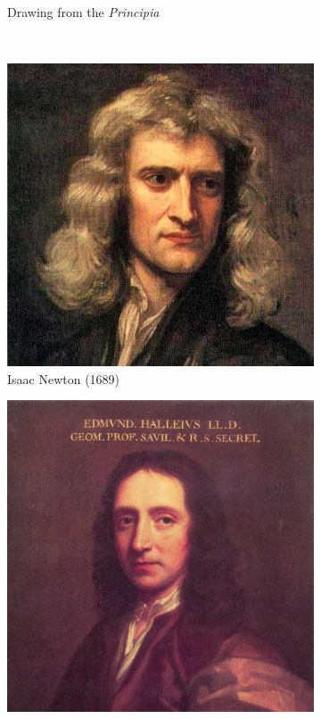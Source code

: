 \begin{figure}
\begin{subfigure}[b]{0.36\textwidth}
        \caption{Drawing from the \textit{Principia}}
        \label{Fig:0_newton_2}
    \end{subfigure}
        \\
    \begin{subfigure}[b]{0.36\textwidth}
    	\centering
    	\includegraphics[width=\linewidth]{Figures/0_newtonportrait.jpg}
        \caption{Isaac Newton (1689)}
        \label{Fig:0_newton_3}
    \end{subfigure}
        \begin{subfigure}[b]{0.35\textwidth}
    	\centering
    	\includegraphics[width=\linewidth]{Figures/0_newtonhalley.jpg}

\end{subfigure}
\end{figure}
